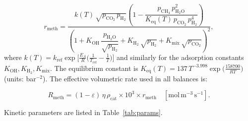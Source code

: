 \documentclass[11pt,a4paper]{article}
\newcommand{\Rmeth}{R_{\mathrm{meth}}}
\newcommand{\eps}{\varepsilon}
\begin{document}
\begin{equation}
  r_{\mathrm{meth}} =
  \frac{k(T)\,\sqrt{p_{\mathrm{CO_2}}\,p_{\mathrm{H_2}}}
        \left(1 - \dfrac{p_{\mathrm{CH_4}}\,p_{\mathrm{H_2O}}^2}
                        {K_{\mathrm{eq}}(T)\,p_{\mathrm{CO_2}}\,p_{\mathrm{H_2}}^4}
        \right)}
       {\left(1 + K_{\mathrm{OH}}\,\dfrac{p_{\mathrm{H_2O}}}{\sqrt{p_{\mathrm{H_2}}}}
              + K_{\mathrm{H_2}}\,\sqrt{p_{\mathrm{H_2}}}
              + K_{\mathrm{mix}}\,\sqrt{p_{\mathrm{CO_2}}}
        \right)^2},
  \label{eq:rate}
\end{equation}
where $k(T)=k_{\mathrm{ref}}\exp\!\bigl[\tfrac{E_A}{R}\bigl(\tfrac{1}{T_{\mathrm{ref}}}-\tfrac{1}{T}\bigr)\bigr]$
and similarly for the adsorption constants $K_{\mathrm{OH}},K_{\mathrm{H_2}},K_{\mathrm{mix}}$.
The equilibrium constant is $K_{\mathrm{eq}}(T)=137\,T^{-3.998}\exp\!\bigl(\tfrac{158700}{RT}\bigr)$
(units: bar$^{-2}$).  The effective volumetric rate used in all balances is:

\begin{equation}
  \Rmeth = (1-\eps)\,\eta\,\rho_{\mathrm{cat}}\times 10^3\times r_{\mathrm{meth}}
  \quad [\mathrm{mol\,m^{-3}\,s^{-1}}].
  \label{eq:Reff}
\end{equation}

Kinetic parameters are listed in Table~\ref{tab:params}.
\end{document}
